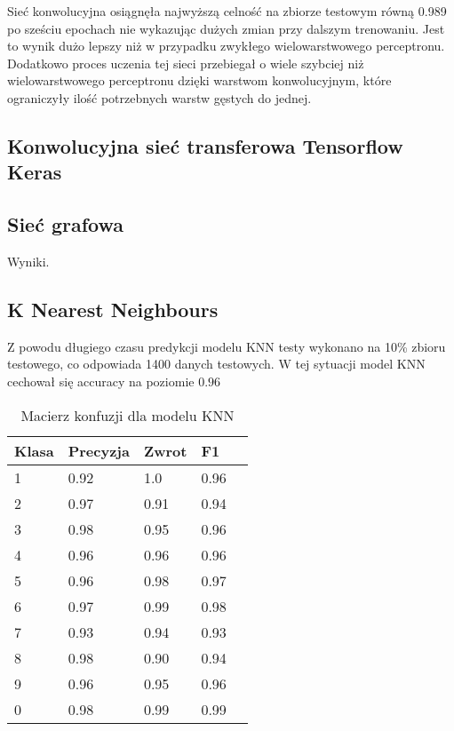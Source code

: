 \documentclass{article}
\begin{document}
Sieć konwolucyjna osiągnęła najwyższą celność na zbiorze testowym równą 0.989 po 
sześciu epochach nie wykazując dużych zmian przy dalszym 
trenowaniu. Jest to wynik dużo lepszy niż w przypadku zwykłego wielowarstwowego 
perceptronu. Dodatkowo proces uczenia tej sieci przebiegał o wiele szybciej niż 
wielowarstwowego perceptronu dzięki warstwom konwolucyjnym, które ograniczyły ilość 
potrzebnych warstw gęstych do jednej.

\subsection{Konwolucyjna sieć transferowa Tensorflow Keras}
\subsection{Sieć grafowa}
Wyniki.
\subsection{K Nearest Neighbours}

Z powodu długiego czasu predykcji modelu KNN testy wykonano na 10\% zbioru testowego, co odpowiada 1400 danych testowych.
W tej sytuacji model KNN cechował się accuracy na poziomie $0.96$

\begin{table}[H]
    \centering
    \begin{tabular}{|l|l|l|l|l|}
    \hline
    Klasa & Precyzja & Zwrot & F1 \\
    \hline
    1     & 0.92     & 1.0   & 0.96 \\
    2     & 0.97     & 0.91  & 0.94 \\
    3     & 0.98     & 0.95  & 0.96 \\
    4     & 0.96     & 0.96  & 0.96 \\
    5     & 0.96     & 0.98  & 0.97 \\
    6     & 0.97     & 0.99  & 0.98 \\
    7     & 0.93     & 0.94  & 0.93 \\
    8     & 0.98     & 0.90  & 0.94 \\
    9     & 0.96     & 0.95  & 0.96 \\
    0     & 0.98     & 0.99  & 0.99 \\
    \hline
    \end{tabular}
    \caption{Macierz konfuzji dla modelu KNN}
\end{table}
\end{document}
